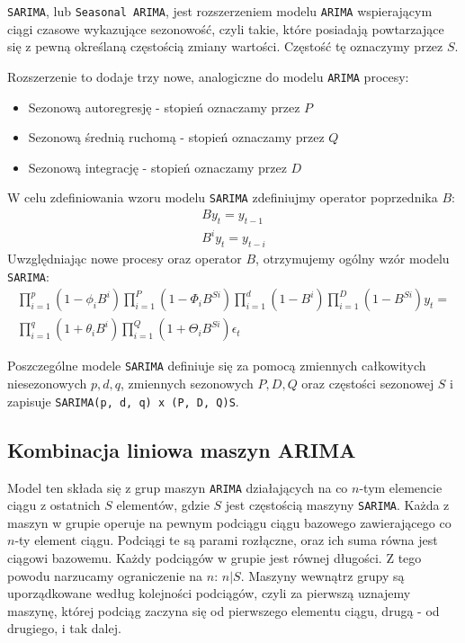 \documentclass[12pt]{article}
\begin{document}
\texttt{SARIMA}, lub \texttt{Seasonal ARIMA}, jest rozszerzeniem modelu \texttt{ARIMA} wspierającym ciągi czasowe wykazujące sezonowość, czyli takie, które posiadają powtarzające się z pewną określaną częstością zmiany wartości. Częstość tę oznaczymy przez $S$.

Rozszerzenie to dodaje trzy nowe, analogiczne do modelu \texttt{ARIMA} procesy:
\begin{itemize}
    \item Sezonową autoregresję - stopień oznaczamy przez $P$
    \item Sezonową średnią ruchomą - stopień oznaczamy przez $Q$
    \item Sezonową integrację - stopień oznaczamy przez $D$
\end{itemize}
W celu zdefiniowania wzoru modelu \texttt{SARIMA} zdefiniujmy operator poprzednika $B$:
\begin{gather*}
    By_t = y_{t-1} \\
    B^iy_t = y_{t-i}
\end{gather*}
Uwzględniając nowe procesy oraz operator $B$, otrzymujemy ogólny wzór modelu \texttt{SARIMA}:
\begin{gather*}
    \prod^p_{i=1}(1 - \phi_iB^i) \prod^P_{i=1}(1 - \Phi_iB^{Si}) \prod^d_{i=1}(1 - B^i) \prod^D_{i=1}(1 - B^{Si})y_t = \\
    \prod^q_{i=1}(1 + \theta_iB^i) \prod^Q_{i=1}(1 + \Theta_iB^{Si}) \epsilon_t
\end{gather*}

Poszczególne modele \texttt{SARIMA} definiuje się za pomocą zmiennych całkowitych niesezonowych $p, d, q$, zmiennych sezonowych $P, D, Q$ oraz częstości sezonowej $S$ i zapisuje \texttt{SARIMA(p, d, q) x (P, D, Q)S}.

\subsection{Kombinacja liniowa maszyn ARIMA}
\label{group-arima}

Model ten składa się z grup maszyn \texttt{ARIMA} działających na co $n$-tym elemencie ciągu z ostatnich $S$ elementów, gdzie $S$ jest częstością maszyny \texttt{SARIMA}. Każda z maszyn w grupie operuje na pewnym podciągu ciągu bazowego zawierającego co $n$-ty element ciągu. Podciągi te są parami rozłączne, oraz ich suma równa jest ciągowi bazowemu. Każdy podciągów w grupie jest równej długości. Z tego powodu narzucamy ograniczenie na $n$: $n|S$. Maszyny wewnątrz grupy są uporządkowane według kolejności podciągów, czyli za pierwszą uznajemy maszynę, której podciąg zaczyna się od pierwszego elementu ciągu, drugą - od drugiego, i tak dalej.
\end{document}
